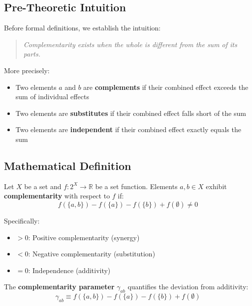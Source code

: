 \subsection{Pre-Theoretic Intuition}

Before formal definitions, we establish the intuition:

\begin{quote}
\textit{Complementarity exists when the whole is different from the sum of its parts.}
\end{quote}

More precisely:
\begin{itemize}
    \item Two elements $a$ and $b$ are \textbf{complements} if their combined effect exceeds the sum of individual effects
    \item Two elements are \textbf{substitutes} if their combined effect falls short of the sum
    \item Two elements are \textbf{independent} if their combined effect exactly equals the sum
\end{itemize}

\subsection{Mathematical Definition}

\begin{definition}
\label{def:complementarity-general}
Let $X$ be a set and $f: 2^X \to \mathbb{R}$ be a set function. Elements $a, b \in X$ exhibit \textbf{complementarity} with respect to $f$ if:
\begin{equation}
f(\{a, b\}) - f(\{a\}) - f(\{b\}) + f(\emptyset) \neq 0
\label{eq:complementarity-general}
\end{equation}

Specifically:
\begin{itemize}
    \item $> 0$: Positive complementarity (synergy)
    \item $< 0$: Negative complementarity (substitution)
    \item $= 0$: Independence (additivity)
\end{itemize}
\end{definition}

\begin{definition}
The \textbf{complementarity parameter} $\gamma_{ab}$ quantifies the deviation from additivity:
\begin{equation}
\gamma_{ab} \equiv f(\{a, b\}) - f(\{a\}) - f(\{b\}) + f(\emptyset)
\label{eq:gamma-definition}
\end{equation}
\end{definition}

